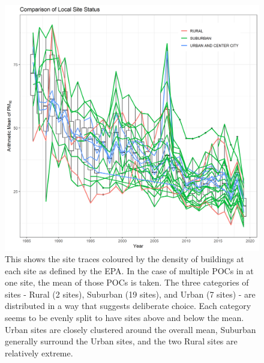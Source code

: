 \begin{figure}[ht]
\centering
\includegraphics[width = \textwidth]{Figures/SOCAB_metadata_Site_Status.png}
\caption{This shows the site traces coloured by the density of buildings at each site as defined by the EPA.  In the case of multiple \ac{POC}s in at one site, the mean of those \ac{POC}s is taken.  The three categories of sites - Rural (2 sites), Suburban (19 sites), and Urban (7 sites) - are distributed in a way that suggests deliberate choice. Each category seems to be evenly split to have sites above and below the mean.  Urban sites are closely clustered around the overall mean, Suburban generally surround the Urban sites, and the two Rural sites are relatively extreme.  }
\label{fig:SOCAB_metadata_Site_Status}
\end{figure}

